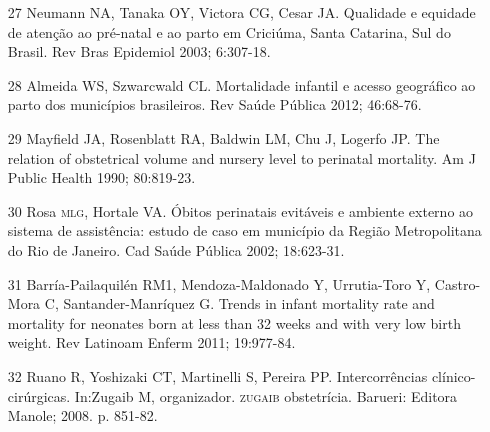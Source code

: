 \documentclass{article}
\begin{document}
\begin{itemize}
\item[27] Neumann NA, Tanaka OY, Victora CG, Cesar JA. Qualidade e equidade
de atenção ao pré-natal e ao parto em Criciúma, Santa Catarina, Sul do Brasil.
Rev Bras Epidemiol 2003; 6:307-18.

\item[28] Almeida WS, Szwarcwald CL. Mortalidade infantil e acesso
geográfico ao parto dos municípios brasileiros. Rev Saúde Pública 2012;
46:68-76.

\item[29] Mayfield JA, Rosenblatt RA, Baldwin LM, Chu J, Logerfo JP. The
relation of obstetrical volume and nursery level to perinatal mortality. Am J
Public Health 1990; 80:819-23.

\item[30] Rosa \textsc{mlg}, Hortale VA. Óbitos perinatais evitáveis e ambiente
externo ao sistema de assistência: estudo de caso em município da Região
Metropolitana do Rio de Janeiro. Cad Saúde Pública 2002;
18:623-31.

\item[31] Barría-Pailaquilén RM1, Mendoza-Maldonado Y, Urrutia-Toro Y,
Castro-Mora C, Santander-Manríquez G. Trends in infant mortality rate and
mortality for neonates born at less than 32 weeks and with very low birth
weight. Rev Latinoam Enferm 2011; 19:977-84.

\item[32] Ruano R, Yoshizaki CT, Martinelli S, Pereira PP. Intercorrências
clínico-cirúrgicas. In:Zugaib M, organizador. \textsc{zugaib} obstetrícia. Barueri:
Editora Manole; 2008. p. 851-82.

\end{itemize}
\end{document}
